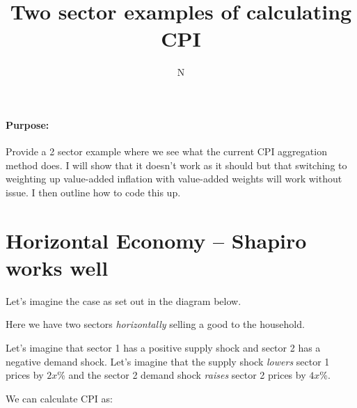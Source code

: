 \documentclass[12pt,english]{article}
\begin{document}
\title{Two sector examples of calculating CPI}
\author{N}
\maketitle

\paragraph{Purpose:} Provide a 2 sector example where we see what the current CPI aggregation method does. I will show that it doesn't work as it should but that switching to weighting up value-added inflation with value-added weights will work without issue. I then outline how to code this up.

\section{Horizontal Economy -- Shapiro works well}

Let's imagine the case as set out in the diagram below.


Here we have two sectors \emph{horizontally} selling a good to the household. 

Let's imagine that sector 1 has a positive supply shock and sector 2 has a negative demand shock. Let's imagine that the supply shock \emph{lowers} sector 1 prices by $2x$\% and the sector 2 demand shock \emph{raises} sector 2 prices by $4x$\%.

We can calculate CPI as:
\end{document}
